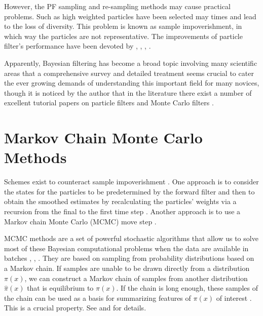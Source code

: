 However, the PF sampling and re-sampling methods may cause practical problems. Such as high weighted particles have been selected may times and lead to the loss of diversity. This problem is known as sample impoverishment, in which way the particles are not representative. The improvements of particle filter's performance have been devoted by \cite{carpenter1999improved}, \cite{godsill2001maximum}, \cite{stavropoulos2001improved}, \cite{smcmip2011}. 


Apparently, Bayesian filtering has become a broad topic involving many scientific areas that a comprehensive survey and detailed treatment seems crucial to cater the ever growing demands of understanding this important field for many novices, though it is noticed by the author that in the literature there exist a number of excellent tutorial papers on particle filters and Monte Carlo filters \cite{chen2003bayesian} \cite{doucet2000sequential} \cite{doucet2000rao} \cite{chen2012monte}.  
 



\section{Markov Chain Monte Carlo Methods}


Schemes exist to counteract sample impoverishment \cite{ristic2004beyond}. One approach is to consider the states for the particles to be predetermined by the forward filter and then to obtain the smoothed estimates by recalculating the particles' weights via a recursion from the final to the first time step \cite{godsill2000methodology}. Another approach is to use a Markov chain Monte Carlo (MCMC) move step \cite{carlin1992monte}.


MCMC methods are a set of powerful stochastic algorithms that allow us to solve most of these Bayesian computational problems when the data are available in batches \cite{andrieu1999sequential}, \cite{green1995reversible}, \cite{andrieu2001model}. They are based on sampling from probability distributions based on a Markov chain. If samples are unable to be drawn directly from a distribution $\pi(x)$, we can construct a Markov chain of samples from another distribution $\hat{\pi}(x)$ that is equilibrium to $\pi(x)$. If the chain is long enough, these samples of the chain can be used as a basis for summarizing features of $\pi(x)$ of interest \cite{smith1993bayesian}. This is a crucial property. See \eg \cite{cappe2009inference} and \cite{liu2008monte} for details. 




